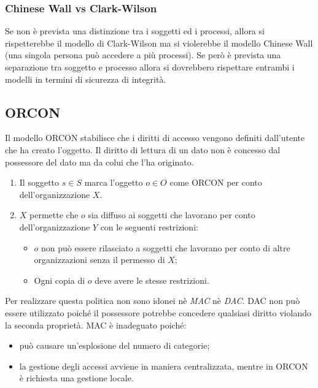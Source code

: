 \subsubsection{Chinese Wall vs Clark-Wilson}

Se non è prevista una distinzione tra i soggetti
ed i processi, allora si rispetterebbe il modello
di Clark-Wilson ma si violerebbe il modello
Chinese Wall (una singola persona può
accedere a più processi). Se però è prevista
una separazione tra soggetto e processo allora
si dovrebbero rispettare entrambi i modelli in
termini di sicurezza di integrità.

\subsection{ORCON \normalfont{}}

Il modello ORCON stabilisce che i diritti di accesso vengono definiti
dall'utente che ha creato l'oggetto. Il diritto di lettura di un dato non è
concesso dal possessore del dato ma da colui che l'ha
originato.

\begin{enumerate}
    \item Il soggetto \(s \in S\) marca l'oggetto \(o \in O\) come ORCON per
          conto dell'organizzazione \(X\).
    \item \(X\) permette che \(o\) sia diffuso ai soggetti che lavorano per
          conto dell'organizzazione \(Y\) con le seguenti restrizioni:
          \begin{itemize}
              \item \(o\) non può essere rilasciato a soggetti che lavorano per
                    conto di altre organizzazioni senza il permesso di \(X\);
              \item Ogni copia di \(o\) deve avere le stesse restrizioni.
          \end{itemize}
\end{enumerate}

Per realizzare questa politica non sono idonei nè \textit{MAC} nè \textit{DAC}.
DAC non può essere utilizzato poiché il possessore potrebbe concedere qualsiasi
diritto violando la seconda proprietà.
MAC è inadeguato poiché:

\begin{itemize}
    \item può causare un'esplosione del numero di categorie;
    \item la gestione degli accessi avviene in maniera centralizzata,
          mentre in ORCON è richiesta
          una gestione locale.
\end{itemize}

